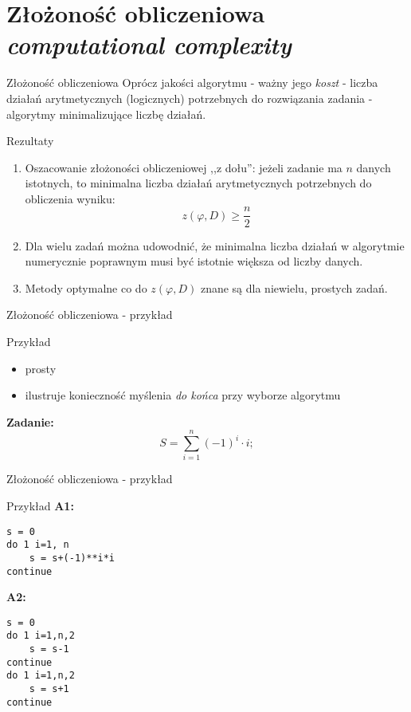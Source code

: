 \section{Złożoność obliczeniowa {\it computational complexity}}
\begin{frame}{Złożoność obliczeniowa}
	Oprócz jakości algorytmu - ważny jego {\it koszt} - liczba działań arytmetycznych (logicznych) potrzebnych do rozwiązania zadania - algorytmy minimalizujące liczbę działań.
\end{frame}
\begin{frame}{Rezultaty}
	\begin{enumerate}
		\item Oszacowanie złożoności obliczeniowej ,,z dołu'': jeżeli zadanie ma $n$ danych istotnych, to minimalna liczba działań arytmetycznych potrzebnych do obliczenia wyniku:
        \[
        	z(\varphi, D) \ge \frac{n}{2}
        \]
        \item Dla wielu zadań można udowodnić, że minimalna liczba działań w algorytmie numerycznie poprawnym musi być istotnie większa od liczby danych.
        \item Metody optymalne co do $z(\varphi, D)$ znane są dla niewielu, prostych zadań.
	\end{enumerate}
\end{frame}
\begin{frame}{Złożoność obliczeniowa - przykład}
	\begin{exampleblock}{Przykład}
        \begin{itemize}
            \item prosty
            \item ilustruje konieczność myślenia {\it do końca} przy wyborze algorytmu
        \end{itemize}
        {\bf Zadanie:}
        \[
        	S = \sum_{i=1}^n (-1)^i \cdot i;
        \]
	\end{exampleblock}
\end{frame}
\begin{frame}[fragile]{Złożoność obliczeniowa - przykład}
	\begin{exampleblock}{Przykład}
    	{\bf A1:}
    	\begin{lstlisting}[escapechar=|]
s = 0
do 1 i=1, n
    s = s+(-1)**i*i
continue \end{lstlisting}
		\vspace{-15pt}
    	{\bf A2:}
    	\begin{lstlisting}[escapechar=|]
s = 0
do 1 i=1,n,2
    s = s-1
continue
do 1 i=1,n,2
	s = s+1
continue \end{lstlisting}
		\vspace{-15pt}
	\end{exampleblock}
\end{frame}
